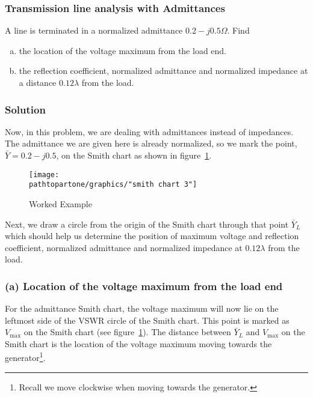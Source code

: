\begin{exmp}
\subsubsection*{Transmission line analysis with Admittances}
A line is terminated in a normalized admittance $0.2-j0.5\varOmega$. Find 
\begin{enumerate}[(a)]
\item the location of the voltage maximum from the load end. 
\item the reflection coefficient, normalized admittance and normalized impedance at a distance $0.12\lambda$ from the load.
\end{enumerate}

\subsubsection*{Solution}
Now, in this problem, we are dealing with admittances instead of impedances. The admittance we are given here is already normalized, so we mark the point, $\bar{Y} = 0.2 - j0.5$, on the Smith chart as shown in figure~\ref{fig:workedexample3}.
\begin{figure}[h]
\centering
\texttt{[image: \\pathtopartone/graphics/"smith chart 3"]}
\caption{Worked Example}
\label{fig:workedexample3}
\end{figure}

Next, we draw a circle from the origin of the Smith chart through that point $\bar{Y}_L$ which should help us determine the position of maximum voltage and reflection coefficient, normalized admittance and normalized impedance at $0.12\lambda$ from the load.

\subsubsection*{(a) Location of the voltage maximum from the load end}
For the admittance Smith chart, the voltage maximum will now lie on the leftmost side of the VSWR circle of the Smith chart. This point is marked as $V_\max$ on the Smith chart (see figure~\ref{fig:workedexample3}). The distance between $\bar{Y}_L$ and $V_\max$ on the Smith chart is the location of the voltage maximum moving towards the generator\footnote{
Recall we move clockwise when moving towards the generator.
}.


\end{exmp}
